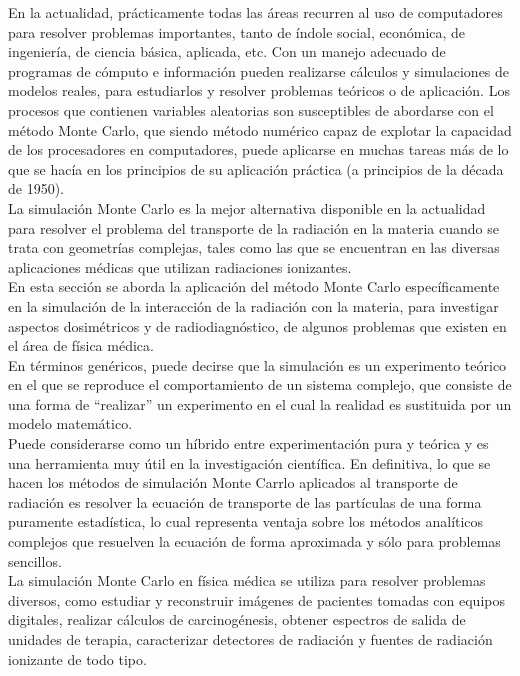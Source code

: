 En la actualidad, pr\'acticamente todas las \'areas recurren al uso de computadores para resolver problemas importantes,
tanto de \'indole social, econ\'omica, de ingenier\'ia, de ciencia b\'asica, aplicada, etc.
%
Con un manejo adecuado de programas de c\'omputo e informaci\'on pueden realizarse c\'alculos y simulaciones de modelos reales,
para estudiarlos y resolver problemas te\'oricos o de aplicaci\'on.
%
Los procesos que contienen variables aleatorias son susceptibles de abordarse con el m\'etodo Monte Carlo, que siendo m\'etodo
num\'erico capaz de explotar la capacidad de los procesadores en computadores, puede aplicarse en muchas tareas m\'as de lo que se
hac\'ia en los principios de su aplicaci\'on pr\'actica (a principios de la d\'ecada de 1950). \\
%
%
La simulaci\'on Monte Carlo es la mejor alternativa disponible en la actualidad para resolver el problema del transporte de la
radiaci\'on en la materia cuando se trata con geometr\'ias complejas, tales como las que se encuentran en las diversas aplicaciones
m\'edicas que utilizan radiaciones ionizantes. \\
%
%
En esta secci\'on se aborda la aplicaci\'on del m\'etodo Monte Carlo espec\'ificamente en la simulaci\'on de la interacci\'on de
la radiaci\'on con la materia, para investigar aspectos dosim\'etricos y de radiodiagn\'ostico, de algunos problemas que existen en el
\'area de f\'isica m\'edica. \\
%
%
En t\'erminos gen\'ericos, puede decirse que la simulaci\'on es un experimento te\'orico en el que se reproduce el comportamiento de
un sistema complejo, que consiste de una forma de ``realizar'' un experimento en el cual la realidad es sustituida por un modelo
matem\'atico.\\
%
%
Puede considerarse como un h\'ibrido entre experimentaci\'on pura y te\'orica y es una herramienta muy \'util en la investigaci\'on
cient\'ifica.
%
En definitiva, lo que se hacen los m\'etodos de simulaci\'on Monte Carrlo aplicados al transporte de radiaci\'on es resolver la ecuaci\'on
de transporte de las part\'iculas de una forma puramente estad\'istica, lo cual representa ventaja sobre los m\'etodos anal\'iticos
complejos que resuelven la ecuaci\'on de forma aproximada y s\'olo para problemas sencillos. \\
%
%
La simulaci\'on Monte Carlo en f\'isica m\'edica se utiliza para resolver problemas diversos, como estudiar y reconstruir im\'agenes de
pacientes tomadas con equipos digitales, realizar c\'alculos de carcinog\'enesis, obtener espectros de salida de unidades de terapia,
caracterizar detectores de radiaci\'on  y fuentes de radiaci\'on ionizante de todo tipo. \\




